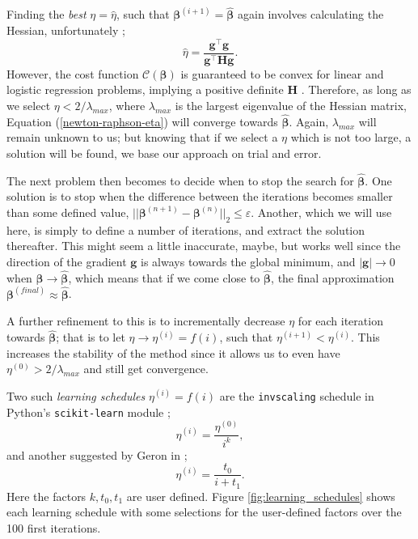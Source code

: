\documentclass[]{article}
\begin{document}
Finding the \textit{best} $\eta = \hat{\eta}$, such that $\mathbf{\beta}^{(i+1)} = \mathbf{\hat{\beta}}$ again involves calculating the Hessian, unfortunately \cite{fys-stk4155-notes}; 
\begin{equation}
	\hat{\eta} = \frac{\mathbf{g}^\intercal \mathbf{g}}{\mathbf{g}^\intercal \mathbf{H} \mathbf{g}}.
\end{equation}
However, the cost function $\mathcal{C}(\mathbf{\beta})$ is guaranteed to be convex for linear and logistic regression problems, implying a positive definite $\mathbf{H}$ \cite{murphy2012machine}. Therefore, as long as we select $\eta < 2/\lambda_{max}$, where $\lambda_{max}$ is the largest eigenvalue of the Hessian matrix, Equation (\ref{newton-raphson-eta}) will converge towards $\mathbf{\hat{\beta}}$. Again, $\lambda_{max}$ will remain unknown to us; but knowing that if we select a $\eta$ which is not too large, a solution will be found, we base our approach on trial and error. 

\vspace{5mm}

The next problem then becomes to decide when to stop the search for $\mathbf{\hat{\beta}}$. One solution is to stop when the difference between the iterations becomes smaller than some defined value, $||\mathbf{\beta}^{(n+1)} - \mathbf{\beta}^{(n)}||_2 \le \varepsilon$. Another, which we will use here, is simply to define a number of iterations, and extract the solution thereafter. This might seem a little inaccurate, maybe, but works well since the direction of the gradient $\mathbf{g}$ is always towards the global minimum, and $|\mathbf{g}| \rightarrow 0$ when $\mathbf{\beta} \rightarrow \mathbf{\hat{\beta}}$, which means that if we come close to $\mathbf{\hat{\beta}}$, the final approximation $\mathbf{\beta}^{(final)} \approx \mathbf{\hat{\beta}}$.

A further refinement to this is to incrementally decrease $\eta$ for each iteration towards $\mathbf{\hat{\beta}}$; that is to let $\eta \rightarrow \eta^{(i)} = f(i)$, such that $\eta^{(i+1)} < \eta^{(i)}$. This increases the stability of the method since it allows us to even have $\eta^{(0)} > 2/\lambda_{max}$ and still get convergence.

Two such \textit{learning schedules} $\eta^{(i)} = f(i)$ are the \lstinline|invscaling| schedule in Python's \lstinline|scikit-learn| module \cite{skl};
\begin{equation} \label{invscaling}
	\eta^{(i)} = \frac{\eta^{(0)}}{i^k},
\end{equation}
and another suggested by Geron in \cite{geron2019hands};
\begin{equation} \label{geron}
	\eta^{(i)} = \frac{t_0}{i + t_1}.
\end{equation}
Here the factors $k, t_0, t_1$ are user defined. Figure \ref{fig:learning_schedules} shows each learning schedule with some selections for the user-defined factors over the 100 first iterations.
\end{document}
